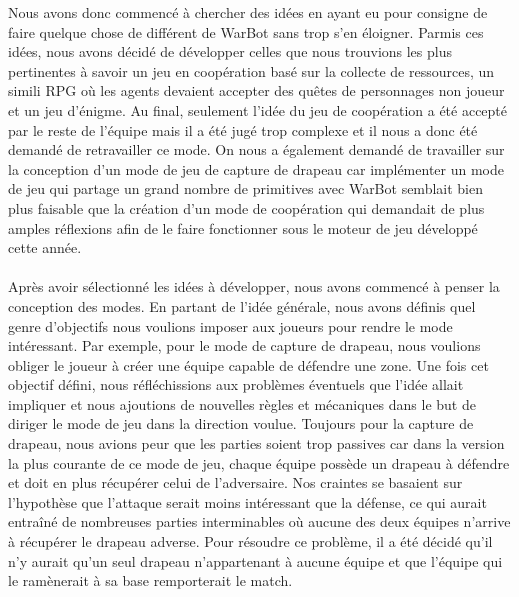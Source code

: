 \documentclass{report}
\begin{document}
  Nous avons donc commencé à chercher des idées en ayant eu pour consigne de faire quelque chose de différent de WarBot sans trop s’en éloigner. Parmis ces idées, nous avons décidé de développer celles que nous trouvions les plus pertinentes à savoir un jeu en coopération basé sur la collecte de ressources, un simili RPG où les agents devaient accepter des quêtes de personnages non joueur et un jeu d’énigme. \newline
Au final, seulement l’idée du jeu de coopération a été accepté par le reste de l’équipe mais il a été jugé trop complexe et il nous a donc été demandé de retravailler ce mode. On nous a également demandé de travailler sur la conception d’un mode de jeu de capture de drapeau car implémenter un mode de jeu qui partage un grand nombre de primitives avec WarBot semblait bien plus faisable que la création d’un mode de coopération qui demandait de plus amples réflexions afin de le faire fonctionner sous le moteur de jeu développé cette année.
 \paragraph{}
 \newpage
  Après avoir sélectionné les idées à développer, nous avons commencé à penser la conception des modes. En partant de l’idée générale, nous avons définis quel genre d’objectifs nous voulions imposer aux joueurs pour rendre le mode intéressant. Par exemple, pour le mode de capture de drapeau, nous voulions obliger le joueur à créer une équipe capable de défendre une zone. \newline
Une fois cet objectif défini, nous réfléchissions aux problèmes éventuels que l’idée allait impliquer et nous ajoutions de nouvelles règles et mécaniques dans le but de diriger le mode de jeu dans la direction voulue. Toujours pour la capture de drapeau, nous avions peur que les parties soient trop passives car dans la version la plus courante de ce mode de jeu, chaque équipe possède un drapeau à défendre et doit en plus récupérer celui de l’adversaire. Nos craintes se basaient sur l'hypothèse que l’attaque serait moins intéressant que la défense, ce qui aurait entraîné de nombreuses parties interminables où aucune des deux équipes n’arrive à récupérer le drapeau adverse. Pour résoudre ce problème, il a été décidé qu’il n’y aurait qu’un seul drapeau n’appartenant à aucune équipe et que l’équipe qui le ramènerait à sa base remporterait le match.
\paragraph{}
\end{document}
